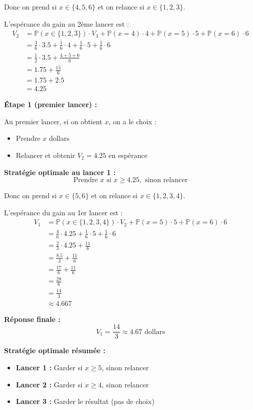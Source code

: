 Donc on prend si $x \in \{4, 5, 6\}$ et on relance si $x \in \{1, 2, 3\}$.

L'espérance du gain au 2ème lancer est :
\begin{align*}
V_2 &= \mathbb{P}(x \in \{1,2,3\}) \cdot V_3 + \mathbb{P}(x = 4) \cdot 4 + \mathbb{P}(x = 5) \cdot 5 + \mathbb{P}(x = 6) \cdot 6 \\
&= \frac{3}{6} \cdot 3.5 + \frac{1}{6} \cdot 4 + \frac{1}{6} \cdot 5 + \frac{1}{6} \cdot 6 \\
&= \frac{1}{2} \cdot 3.5 + \frac{4 + 5 + 6}{6} \\
&= 1.75 + \frac{15}{6} \\
&= 1.75 + 2.5 \\
&= 4.25
\end{align*}

\textbf{Étape 1 (premier lancer) :}

Au premier lancer, si on obtient $x$, on a le choix :
\begin{itemize}
    \item Prendre $x$ dollars
    \item Relancer et obtenir $V_2 = 4.25$ en espérance
\end{itemize}

\textbf{Stratégie optimale au lancer 1 :}
\[
\text{Prendre } x \text{ si } x \geq 4.25, \text{ sinon relancer}
\]

Donc on prend si $x \in \{5, 6\}$ et on relance si $x \in \{1, 2, 3, 4\}$.

L'espérance du gain au 1er lancer est :
\begin{align*}
V_1 &= \mathbb{P}(x \in \{1,2,3,4\}) \cdot V_2 + \mathbb{P}(x = 5) \cdot 5 + \mathbb{P}(x = 6) \cdot 6 \\
&= \frac{4}{6} \cdot 4.25 + \frac{1}{6} \cdot 5 + \frac{1}{6} \cdot 6 \\
&= \frac{2}{3} \cdot 4.25 + \frac{11}{6} \\
&= \frac{8.5}{3} + \frac{11}{6} \\
&= \frac{17}{6} + \frac{11}{6} \\
&= \frac{28}{6} \\
&= \frac{14}{3} \\
&\approx 4.667
\end{align*}

\textbf{Réponse finale :}
\[
\boxed{V_1 = \frac{14}{3} \approx 4.67 \text{ dollars}}
\]

\textbf{Stratégie optimale résumée :}
\begin{itemize}
    \item \textbf{Lancer 1 :} Garder si $x \geq 5$, sinon relancer
    \item \textbf{Lancer 2 :} Garder si $x \geq 4$, sinon relancer
    \item \textbf{Lancer 3 :} Garder le résultat (pas de choix)
\end{itemize}

